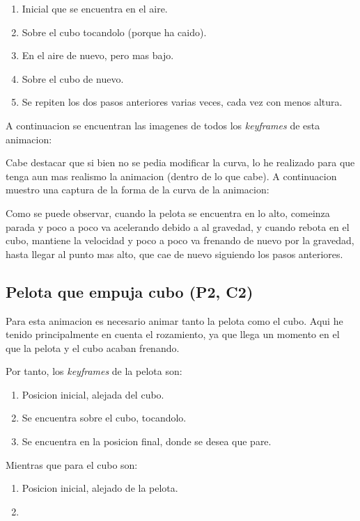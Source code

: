 \documentclass{article}
\begin{document}
\begin{enumerate}
    \item Inicial que se encuentra en el aire.
    \item Sobre el cubo tocandolo (porque ha caido).
    \item En el aire de nuevo, pero mas bajo.
    \item Sobre el cubo de nuevo.
    \item Se repiten los dos pasos anteriores varias veces, cada vez con menos altura.
\end{enumerate}

A continuacion se encuentran las imagenes de todos los \textit{keyframes} de esta animacion:



Cabe destacar que si bien no se pedia modificar la curva, lo he realizado para que tenga aun mas realismo la animacion (dentro de lo que cabe). A continuacion muestro una captura de la forma de la curva de la animacion:



Como se puede observar, cuando la pelota se encuentra en lo alto, comeinza parada y poco a poco va acelerando debido a al gravedad, y cuando rebota en el cubo, mantiene la velocidad y poco a poco va frenando de nuevo por la gravedad, hasta llegar al punto mas alto, que cae de nuevo siguiendo los pasos anteriores.

\subsection{Pelota que empuja cubo (P2, C2)}

Para esta animacion es necesario animar tanto la pelota como el cubo. Aqui he tenido principalmente en cuenta el rozamiento, ya que llega un momento en el que la pelota y el cubo acaban frenando.

\bigskip

Por tanto, los \textit{keyframes} de la pelota son:

\begin{enumerate}
    \item Posicion inicial, alejada del cubo.
    \item Se encuentra sobre el cubo, tocandolo.
    \item Se encuentra en la posicion final, donde se desea que pare.
\end{enumerate}

Mientras que para el cubo son:

\begin{enumerate}
    \item Posicion inicial, alejado de la pelota.
    \item 
\end{enumerate}
\end{document}
